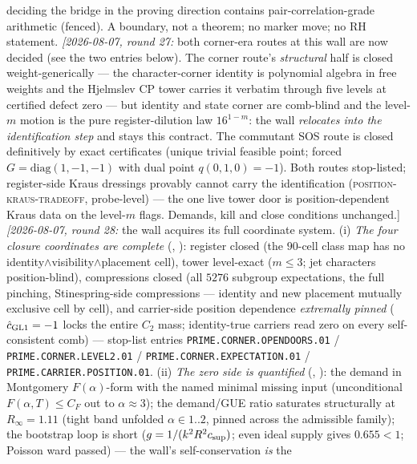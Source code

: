 \documentclass[11pt,a4paper]{article}
\begin{document}
{deciding the bridge in the proving direction contains
pair-correlation-grade arithmetic (fenced).  A boundary, not a
theorem; no marker move; no RH statement.
\emph{[2026-08-07, round 27:} both corner-era routes at this wall
are now decided (see the two entries below).  The corner route's
\emph{structural} half is closed weight-generically --- the
character-corner identity is polynomial algebra in free weights
and the Hjelmslev CP tower carries it verbatim through five
levels at certified defect zero --- but identity and state corner
are comb-blind and the level-$m$ motion is the pure
register-dilution law $16^{1-m}$: the wall \emph{relocates into
the identification step} and stays this contract.  The commutant
SOS route is closed definitively by exact certificates (unique
trivial feasible point; forced $G = \mathrm{diag}(1,-1,-1)$ with
dual point $q(0,1,0) = -1$).  Both routes stop-listed;
register-side Kraus dressings provably cannot carry the
identification (\textsc{position-kraus-tradeoff}, probe-level) ---
the one live tower door is position-dependent Kraus data on the
level-$m$ flags.  Demands, kill and close conditions
unchanged.]
\emph{[2026-08-07, round 28:} the wall acquires its full
coordinate system.  (i) \emph{The four closure coordinates are
complete} (,
): register closed
(the $90$-cell class map has no
identity$\wedge$visibility$\wedge$placement cell), tower
level-exact ($m \le 3$; jet characters position-blind),
compressions closed (all $5276$ subgroup expectations, the full
pinching, Stinespring-side compressions --- identity and new
placement mutually exclusive cell by cell), and carrier-side
position dependence \emph{extremally pinned}
($\hat c_{\rm GL1} = -1$ locks the entire $C_2$ mass;
identity-true carriers read zero on every self-consistent comb)
--- stop-list entries \texttt{PRIME.CORNER.OPENDOORS.01} /
\texttt{PRIME.CORNER.LEVEL2.01} /
\texttt{PRIME.CORNER.EXPECTATION.01} /
\texttt{PRIME.CARRIER.POSITION.01}.  (ii) \emph{The zero side is
quantified} (,
): the demand in Montgomery
$F(\alpha)$-form with the named minimal missing input
(unconditional $F(\alpha, T) \le C_F$ out to $\alpha \approx 3$);
the demand/GUE ratio saturates structurally at $R_\infty = 1.11$
(tight band unfolded $\alpha \in 1..2$, pinned across the
admissible family); the bootstrap loop is short ($g = 1/(k^2 R^2
c_{\rm sup})$; even ideal supply gives $0.655 < 1$; Poisson ward
passed) --- the wall's self-conservation \emph{is} the
}
\end{document}
